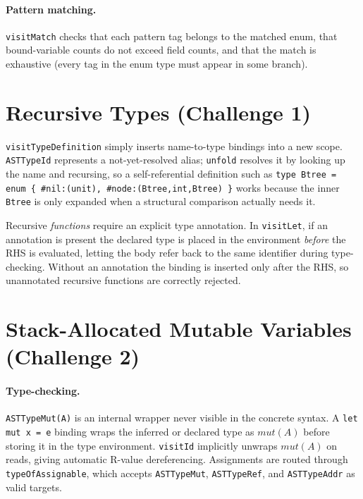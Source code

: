 \documentclass[10pt,a4paper]{article}
\begin{document}
\paragraph{Pattern matching.}
\texttt{visitMatch} checks that each pattern tag belongs to the matched enum, that
bound-variable counts do not exceed field counts, and that the match is exhaustive
(every tag in the enum type must appear in some branch).

\section{Recursive Types (Challenge 1)}

\texttt{visitTypeDefinition} simply inserts name-to-type bindings into a new scope.
\texttt{ASTTypeId} represents a not-yet-resolved alias; \texttt{unfold} resolves it
by looking up the name and recursing, so a self-referential definition such as
\texttt{type Btree = enum \{ \#nil:(unit), \#node:(Btree,int,Btree) \}} works because
the inner \texttt{Btree} is only expanded when a structural comparison actually needs it.

Recursive \emph{functions} require an explicit type annotation.
In \texttt{visitLet}, if an annotation is present the declared type is placed in
the environment \emph{before} the RHS is evaluated, letting the body refer back to
the same identifier during type-checking.
Without an annotation the binding is inserted only after the RHS, so unannotated
recursive functions are correctly rejected.

\section{Stack-Allocated Mutable Variables (Challenge 2)}

\paragraph{Type-checking.}
\texttt{ASTTypeMut(A)} is an internal wrapper never visible in the concrete syntax.
A \texttt{let mut x = e} binding wraps the inferred or declared type as
$\mathit{mut}(A)$ before storing it in the type environment.
\texttt{visitId} implicitly unwraps $\mathit{mut}(A)$ on reads, giving automatic
R-value dereferencing.
Assignments are routed through \texttt{typeOfAssignable}, which accepts
\texttt{ASTTypeMut}, \texttt{ASTTypeRef}, and \texttt{ASTTypeAddr} as valid targets.
\end{document}

